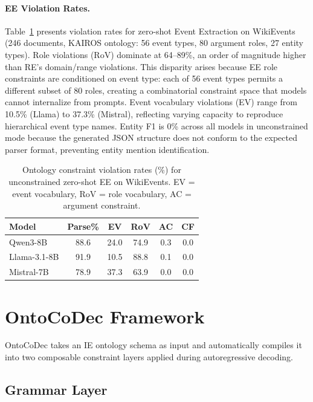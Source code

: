 \documentclass[11pt,a4paper]{article}
\newcommand{\sys}{OntoCoDec}
\begin{document}
\paragraph{EE Violation Rates.}
Table~\ref{tab:ee_violations} presents violation rates for zero-shot Event Extraction on WikiEvents (246 documents, KAIROS ontology: 56 event types, 80 argument roles, 27 entity types). Role violations (RoV) dominate at 64--89\%, an order of magnitude higher than RE's domain/range violations. This disparity arises because EE role constraints are conditioned on event type: each of 56 event types permits a different subset of 80 roles, creating a combinatorial constraint space that models cannot internalize from prompts. Event vocabulary violations (EV) range from 10.5\% (Llama) to 37.3\% (Mistral), reflecting varying capacity to reproduce hierarchical event type names. Entity F1 is 0\% across all models in unconstrained mode because the generated JSON structure does not conform to the expected parser format, preventing entity mention identification.

\begin{table}[t]
\centering
\small
\caption{Ontology constraint violation rates (\%) for unconstrained zero-shot EE on WikiEvents. EV = event vocabulary, RoV = role vocabulary, AC = argument constraint.}
\label{tab:ee_violations}
\begin{tabular}{lccccc}
\toprule
Model & Parse\% & EV & RoV & AC & CF \\
\midrule
Qwen3-8B & 88.6 & 24.0 & 74.9 & 0.3 & 0.0 \\
Llama-3.1-8B & 91.9 & 10.5 & 88.8 & 0.1 & 0.0 \\
Mistral-7B & 78.9 & 37.3 & 63.9 & 0.0 & 0.0 \\
\bottomrule
\end{tabular}
\end{table}

\section{\sys{} Framework}
\label{sec:method}

\sys{} takes an IE ontology schema as input and automatically compiles it into two composable constraint layers applied during autoregressive decoding.

\subsection{Grammar Layer}
\label{sec:grammar}
\end{document}
